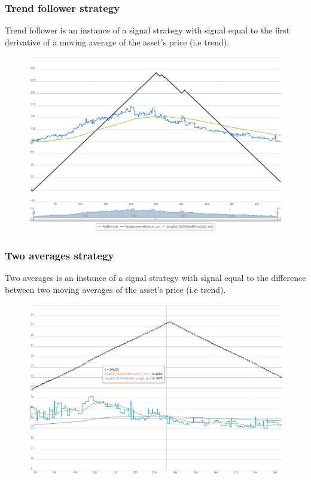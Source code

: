 \documentclass{beamer}
\begin{document}

\begin{frame}
\frametitle{Trend follower strategy}
Trend follower is an instance of a signal strategy with signal equal to the first derivative of a moving average of the asset's price (i.e trend).
\begin{figure}[htbp]
\centering
\includegraphics[width=1\linewidth]{trendfollower.png}
\end{figure}
\end{frame}


\begin{frame}
\frametitle{Two averages strategy}
Two averages is an instance of a signal strategy with signal equal to the difference between two moving averages of the asset's price (i.e trend).
\begin{figure}[htbp]
\centering
\includegraphics[width=1\linewidth]{twoaverages.png}
\end{figure}
\end{frame}
\end{document}
